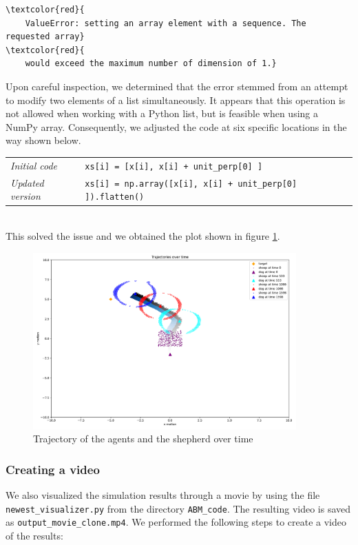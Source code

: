 \begin{Verbatim}[commandchars=\\\{\}]
\textcolor{red}{
    ValueError: setting an array element with a sequence. The requested array}
\textcolor{red}{
    would exceed the maximum number of dimension of 1.}
\end{Verbatim}

Upon careful inspection, we determined that the error stemmed from an attempt to modify two elements of a list simultaneously. It appears that this operation is not allowed when working with a Python list, but is feasible when using a NumPy array. Consequently, we adjusted the code at six specific locations in the way shown below.\\

\begin{tabular}{ll}
\textit{Initial code} & \texttt{xs[i] = [x[i], x[i] + unit\_perp[0] ]} \\
\textit{Updated version} & \texttt{xs[i] = np.array([x[i], x[i] + unit\_perp[0] ]).flatten()}
\end{tabular}\\

This solved the issue and we obtained the plot shown in figure \ref{fig:output_plot}.

\begin{figure}[h]
    \centering\includegraphics[width=0.9\textwidth]{figures/output_plot.png}\caption{Trajectory of the agents and the shepherd over time}
    \label{fig:output_plot}
\end{figure}

\subsubsection{Creating a video}
We also visualized the simulation results through a movie by using the file \texttt{newest\_visualizer.py} from the directory \texttt{ABM\_code}. The resulting video is saved as \texttt{output\_movie\_clone.mp4}. We performed the following steps to create a video of the results:

